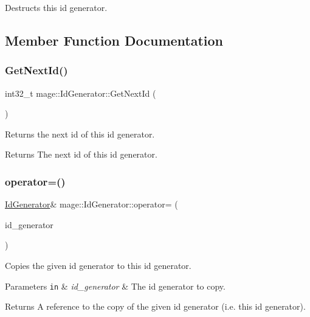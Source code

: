 Destructs this id generator. 

\subsection{Member Function Documentation}
\hypertarget{structmage_1_1_id_generator_ae1d2373c92c717b1344e78ef71260e37}{}\label{structmage_1_1_id_generator_ae1d2373c92c717b1344e78ef71260e37} 
\subsubsection{\texorpdfstring{Get\+Next\+Id()}{GetNextId()}}
{\footnotesize\ttfamily int32\+\_\+t mage\+::\+Id\+Generator\+::\+Get\+Next\+Id (\begin{DoxyParamCaption}{ }\end{DoxyParamCaption})}

Returns the next id of this id generator.

\begin{DoxyReturn}{Returns}
The next id of this id generator. 
\end{DoxyReturn}
\hypertarget{structmage_1_1_id_generator_a370c8289f38a534006e8b9ca7ec78026}{}\label{structmage_1_1_id_generator_a370c8289f38a534006e8b9ca7ec78026} 
\subsubsection{\texorpdfstring{operator=()}{operator=()}\hspace{0.1cm}{\footnotesize\ttfamily [1/2]}}
{\footnotesize\ttfamily \hyperlink{structmage_1_1_id_generator}{Id\+Generator}\& mage\+::\+Id\+Generator\+::operator= (\begin{DoxyParamCaption}\item[{const \hyperlink{structmage_1_1_id_generator}{Id\+Generator} \&}]{id\+\_\+generator }\end{DoxyParamCaption})\hspace{0.3cm}{\ttfamily [delete]}}

Copies the given id generator to this id generator.


\begin{DoxyParams}[1]{Parameters}
\mbox{\tt in}  & {\em id\+\_\+generator} & The id generator to copy. \\
\hline
\end{DoxyParams}
\begin{DoxyReturn}{Returns}
A reference to the copy of the given id generator (i.\+e. this id generator). 
\end{DoxyReturn}
\hypertarget{structmage_1_1_id_generator_aace8082947445d26d2421ba8b361f1bc}{}\label{structmage_1_1_id_generator_aace8082947445d26d2421ba8b361f1bc} 
